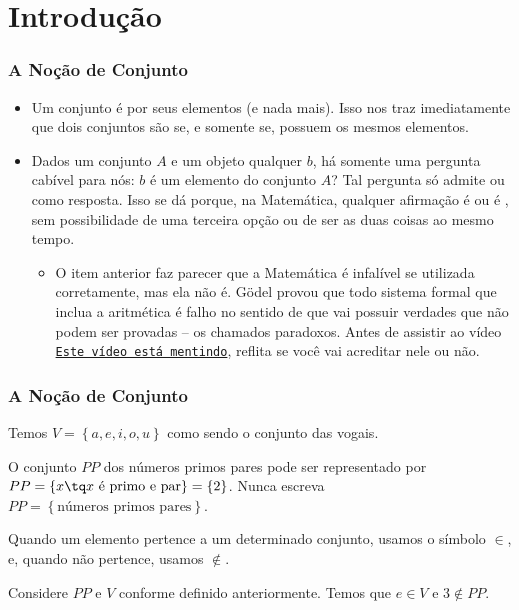 \section{Introdução}


\begin{frame}
    \frametitle{A Noção de Conjunto}
    
    \begin{itemize}
        \item<1->
        Um conjunto é  por seus elementos (e nada mais). Isso nos traz imediatamente que dois conjuntos são  se, e somente se, possuem os mesmos elementos.

        \item<2->
        Dados um conjunto $A$ e um objeto qualquer $b$, há somente uma pergunta cabível para nós: $b$ é um elemento do conjunto $A$? Tal pergunta só admite  ou  como resposta. Isso se dá porque, na Matemática, qualquer afirmação é  ou é , sem possibilidade de uma terceira opção ou de ser as duas coisas ao mesmo tempo.
        \begin{itemize}
            \item<3-> O item anterior faz parecer que a Matemática é infalível se utilizada corretamente, mas ela não é. Gödel provou que todo sistema formal que inclua a aritmética é falho no sentido de que vai possuir verdades que não podem ser provadas -- os chamados paradoxos.  Antes de assistir ao vídeo \href{https://youtu.be/UI1xR_AECrU}{{\tt Este vídeo está mentindo}}, reflita se você vai acreditar nele ou não.
        \end{itemize}
    \end{itemize}
\end{frame}


\begin{frame}
    \frametitle{A Noção de Conjunto}

    \begin{exemplo}
        Temos $V = \left\{a, e, i, o, u \right\}$ como sendo o conjunto das vogais.
    \end{exemplo}

    \begin{exemplo}
        O conjunto $PP$ dos números primos pares pode ser representado por $PP = \left\{ x \tq x \text{ é primo e par} \right\} = \left\{ 2 \right\}$. Nunca escreva $PP = \left\{ \text{números primos pares} \right\}$.
    \end{exemplo}
    
    Quando um elemento pertence a um determinado conjunto, usamos o símbolo $\in$, e, quando não pertence, usamos $\notin$.
	
    \begin{exemplo}
        Considere $PP$ e $V$ conforme definido anteriormente. Temos que $e \in V$ e $3 \notin PP$.
    \end{exemplo}
\end{frame}


